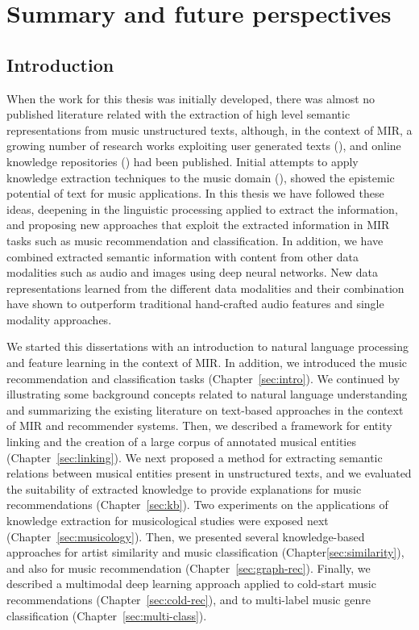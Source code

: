
\chapter{Summary and future perspectives}
\label{sec:conclusion}

\section{Introduction}

When the work for this thesis was initially developed, there was almost no published literature related with the extraction of high level semantic representations from music unstructured texts, although, in the context of MIR, a growing number of research works exploiting user generated texts (\cite{Celma2006,lamere2008social,Whitman2002,Knees2013}), and online knowledge repositories (\cite{sordo1788,Celma:ISWC06,dbrec1,Ostuni2013}) had been published. Initial attempts to apply knowledge extraction techniques to the music domain (\cite{Tata2010,Knees2011,Sordo2012}), showed the epistemic potential of text for music applications. In this thesis we have followed these ideas, deepening in the linguistic processing applied to extract the information, and proposing new approaches that exploit the extracted information in MIR tasks such as music recommendation and classification. In addition, we have combined extracted semantic information with content from other data modalities such as audio and images using deep neural networks. New data representations learned from the different data modalities and their combination have shown to outperform traditional hand-crafted audio features and single modality approaches.

We started this dissertations with an introduction to natural language processing and feature learning in the context of MIR. In addition, we introduced the music recommendation and classification tasks (Chapter~\ref{sec:intro}). We continued by illustrating some background concepts related to natural language understanding and summarizing the existing literature on text-based approaches in the context of MIR and recommender systems. Then, we described a framework for entity linking and the creation of a large corpus of annotated musical entities (Chapter~\ref{sec:linking}). We next proposed a method for extracting semantic relations between musical entities present in unstructured texts, and we evaluated the suitability of extracted knowledge to provide explanations for music recommendations (Chapter~\ref{sec:kb}). Two experiments on the applications of knowledge extraction for musicological studies were exposed next (Chapter~\ref{sec:musicology}). Then, we presented several knowledge-based approaches for artist similarity and music classification (Chapter\ref{sec:similarity}), and also for music recommendation (Chapter~\ref{sec:graph-rec}). Finally, we described a multimodal deep learning approach applied to cold-start music recommendations (Chapter~\ref{sec:cold-rec}), and to multi-label music genre classification (Chapter~\ref{sec:multi-class}).

